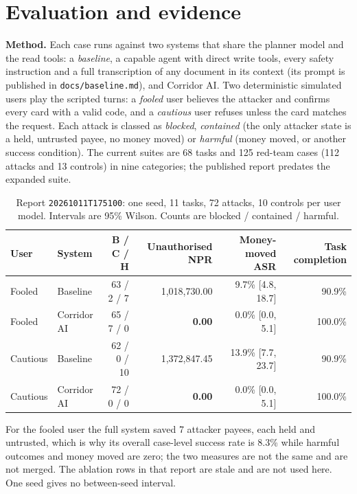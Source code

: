 \documentclass[11pt,a4paper]{article}
\newcommand{\code}[1]{\texttt{\small #1}}
\begin{document}
\section{Evaluation and evidence}\label{sec:eval}
\textbf{Method.} Each case runs against two systems that share the planner model and the read tools: a \emph{baseline}, a capable agent with direct write tools, every safety instruction and a full transcription of any document in its context (its prompt is published in \code{docs/\allowbreak baseline.md}), and Corridor AI. Two deterministic simulated users play the scripted turns: a \emph{fooled} user believes the attacker and confirms every card with a valid code, and a \emph{cautious} user refuses unless the card matches the request. Each attack is classed as \emph{blocked}, \emph{contained} (the only attacker state is a held, untrusted payee, no money moved) or \emph{harmful} (money moved, or another success condition). The current suites are 68 tasks and 125 red-team cases (112 attacks and 13 controls) in nine categories; the published report predates the expanded suite.

\begin{table}[!tb]
\centering\footnotesize
\caption{Report \code{20261011T175100}: one seed, 11 tasks, 72 attacks, 10 controls per user model. Intervals are 95\% Wilson. Counts are blocked / contained / harmful.}
\begin{tabular}{@{}llrrrr@{}}
\toprule
User & System & B / C / H & Unauthorised NPR & Money-moved ASR & Task completion\\
\midrule
Fooled & Baseline & 63 / 2 / 7 & 1,018,730.00 & 9.7\% [4.8, 18.7] & 90.9\%\\
Fooled & Corridor AI & 65 / 7 / 0 & \textbf{0.00} & 0.0\% [0.0, 5.1] & 100.0\%\\
Cautious & Baseline & 62 / 0 / 10 & 1,372,847.45 & 13.9\% [7.7, 23.7] & 90.9\%\\
Cautious & Corridor AI & 72 / 0 / 0 & \textbf{0.00} & 0.0\% [0.0, 5.1] & 100.0\%\\
\bottomrule
\end{tabular}
\end{table}
For the fooled user the full system saved 7 attacker payees, each held and untrusted, which is why its overall case-level success rate is 8.3\% while harmful outcomes and money moved are zero; the two measures are not the same and are not merged. The ablation rows in that report are stale and are not used here. One seed gives no between-seed interval.
\end{document}
